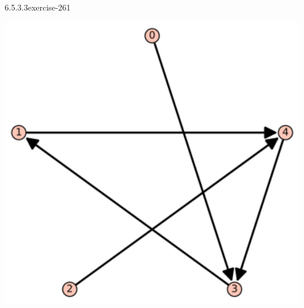 \documentclass[twoside,10pt,]{book}
\numberwithin{equation}{section}
\begin{document}
\begin{divisionsolution}{6.5.3.3}{}{exercise-261}
\begin{sidebyside}{2}{0.01}{0.01}{0.02}
\begin{sbspanel}{0.48}
\end{sbspanel}%
\begin{sbspanel}{0.48}%
\includegraphics[width=1\linewidth]{images/S65-3s2}
\end{sbspanel}%
\nopagebreak%
\begin{sbscaption}{0.48}%
\end{sbscaption}%
\begin{sbscaption}{0.48}%
\end{sbscaption}%
\end{sidebyside}%
\begin{sidebyside}{2}{0.01}{0.01}{0.02}%
\begin{sbspanel}{0.48}%

\end{sbspanel}
\end{sidebyside}
\end{divisionsolution}
\end{document}
